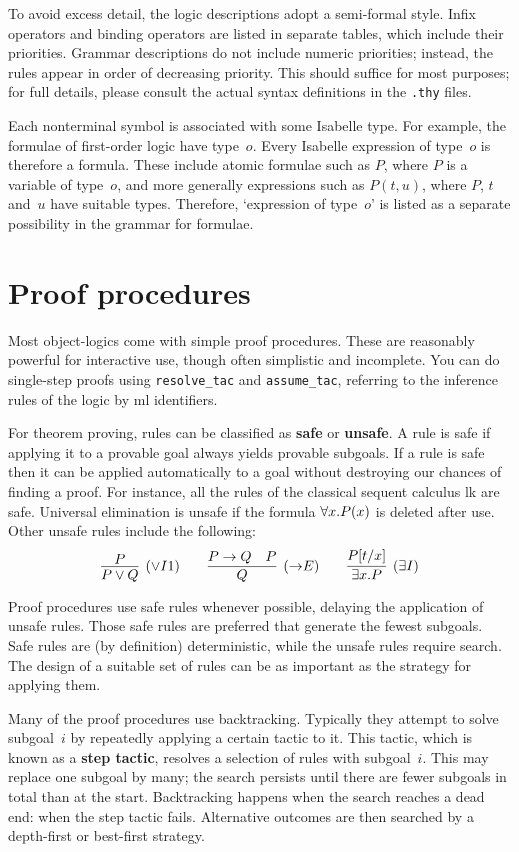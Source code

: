 To avoid excess detail, the logic descriptions adopt a semi-formal style.
Infix operators and binding operators are listed in separate tables, which
include their priorities.  Grammar descriptions do not include numeric
priorities; instead, the rules appear in order of decreasing priority.
This should suffice for most purposes; for full details, please consult the
actual syntax definitions in the {\tt.thy} files.

Each nonterminal symbol is associated with some Isabelle type.  For
example, the formulae of first-order logic have type~$o$.  Every
Isabelle expression of type~$o$ is therefore a formula.  These include
atomic formulae such as $P$, where $P$ is a variable of type~$o$, and more
generally expressions such as $P(t,u)$, where $P$, $t$ and~$u$ have
suitable types.  Therefore, `expression of type~$o$' is listed as a
separate possibility in the grammar for formulae.


\section{Proof procedures}\label{sec:safe}
Most object-logics come with simple proof procedures.  These are reasonably
powerful for interactive use, though often simplistic and incomplete.  You
can do single-step proofs using \verb|resolve_tac| and
\verb|assume_tac|, referring to the inference rules of the logic by {\sc
ml} identifiers.

For theorem proving, rules can be classified as {\bf safe} or {\bf unsafe}.
A rule is safe if applying it to a provable goal always yields provable
subgoals.  If a rule is safe then it can be applied automatically to a goal
without destroying our chances of finding a proof.  For instance, all the
rules of the classical sequent calculus {\sc lk} are safe.  Universal
elimination is unsafe if the formula $\forall x.P(x)$ is deleted after use.
Other unsafe rules include the following:
\[ \infer[({\disj}I1)]{P\disj Q}{P} \qquad 
   \infer[({\imp}E)]{Q}{P\imp Q & P} \qquad
   \infer[({\exists}I)]{\exists x.P}{P[t/x]} 
\]

Proof procedures use safe rules whenever possible, delaying the application
of unsafe rules. Those safe rules are preferred that generate the fewest
subgoals. Safe rules are (by definition) deterministic, while the unsafe
rules require search. The design of a suitable set of rules can be as
important as the strategy for applying them.

Many of the proof procedures use backtracking.  Typically they attempt to
solve subgoal~$i$ by repeatedly applying a certain tactic to it.  This
tactic, which is known as a {\bf step tactic}, resolves a selection of
rules with subgoal~$i$. This may replace one subgoal by many;  the
search persists until there are fewer subgoals in total than at the start.
Backtracking happens when the search reaches a dead end: when the step
tactic fails.  Alternative outcomes are then searched by a depth-first or
best-first strategy.  
